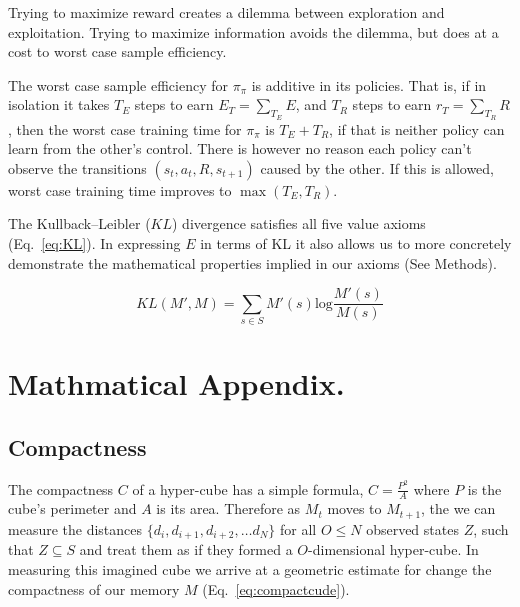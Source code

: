 \documentclass[9pt,twocolumn,twoside]{pnas-new}
\begin{document}

Trying to maximize reward creates a dilemma between exploration and exploitation. Trying to maximize information avoids the dilemma, but does at a cost to worst case sample efficiency. 

The worst case sample efficiency for $\pi_{\pi}$ is additive in its policies. That is, if in isolation it takes $T_E$ steps to earn $E_{T} = \sum_{T_E} E$, and $T_R$ steps to earn $r_{T} = \sum_{T_R} R$, then the worst case training time for $\pi_{\pi}$ is $T_E + T_R$, if that is neither policy can learn from the other's control. There is however no reason each policy can't observe the transitions $(s_t, a_t, R, s_{t+1})$ caused by the other. If this is allowed,  worst case training time improves to $\max(T_E, T_R)$. 


The Kullback--Leibler ($KL$) divergence satisfies all five value axioms (Eq.~\ref{eq:KL}). In expressing $E$ in terms of KL it also allows us to more concretely demonstrate the mathematical properties implied in our axioms (See Methods).

\begin{equation}
    KL(M', M) = \sum_{s \in S} M'(s) \text{log} \frac{M'(s)}{M(s)} 
    \label{eq:KL}
\end{equation}





\clearpage
\newpage
\section*{Mathmatical Appendix.}
\subsection*{Compactness}
The compactness $C$ of a hyper-cube has a simple formula, $C = \frac{P^2}{A}$ where $P$ is the cube's perimeter and $A$ is its area. Therefore as $M_{t}$ moves to $M_{t+1}$, the we can measure the distances $\{d_i, d_{i+1}, d_{i+2},\ldots d_{N}\}$ for all $O \leq N$ observed states $Z$, such that $Z \subseteq S$ and treat them as if they formed a $O$-dimensional hyper-cube. In measuring this imagined cube we arrive at a geometric estimate for change the compactness of our memory $M$ (Eq.~\ref{eq:compactcude}).
\end{document}
